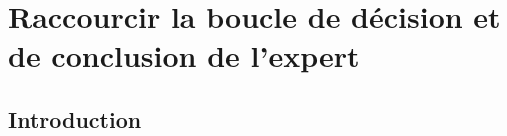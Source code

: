 \chapter[Lier l'analyse à la visualisation dans un même espace de travail]{Raccourcir la boucle de décision et de conclusion de l'expert}
\label{Sec:visuAna}
\minitoc
\cleardoublepage

% 



\section{Introduction}

